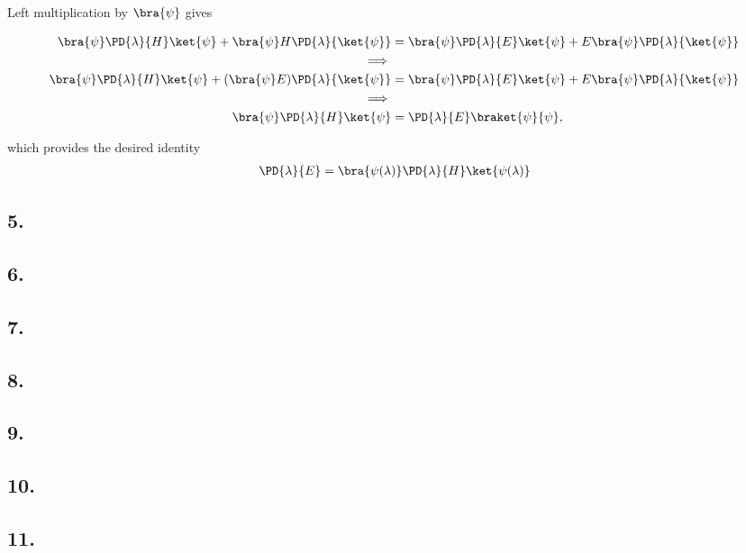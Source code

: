 Left multiplication by $\bra{\psi}$ gives

\begin{align*}
\bra{\psi}\PD{\lambda}{H} \ket{\psi} +\bra{\psi}H \PD{\lambda}{\ket{\psi}} &= \bra{\psi}\PD{\lambda}{E} \ket{\psi} +  E \bra{\psi}\PD{\lambda}{\ket{\psi} } \\
\implies \\
\bra{\psi}\PD{\lambda}{H} \ket{\psi} +(\bra{\psi}E) \PD{\lambda}{\ket{\psi}} &= \bra{\psi}\PD{\lambda}{E} \ket{\psi} +  E \bra{\psi}\PD{\lambda}{\ket{\psi} } \\
\implies \\
\bra{\psi}\PD{\lambda}{H} \ket{\psi} &= \PD{\lambda}{E} \braket{\psi}{\psi},
\end{align*}

which provides the desired identity
\begin{align}\label{eqn:desaiCh3:1}
\PD{\lambda}{E} 
= \bra{\psi(\lambda)}\PD{\lambda}{H} \ket{\psi(\lambda)}
\end{align}

\subsection{5. }
\subsection{6. }
\subsection{7. }
\subsection{8. }
\subsection{9. }
\subsection{10. }
\subsection{11. }

\EndArticle
